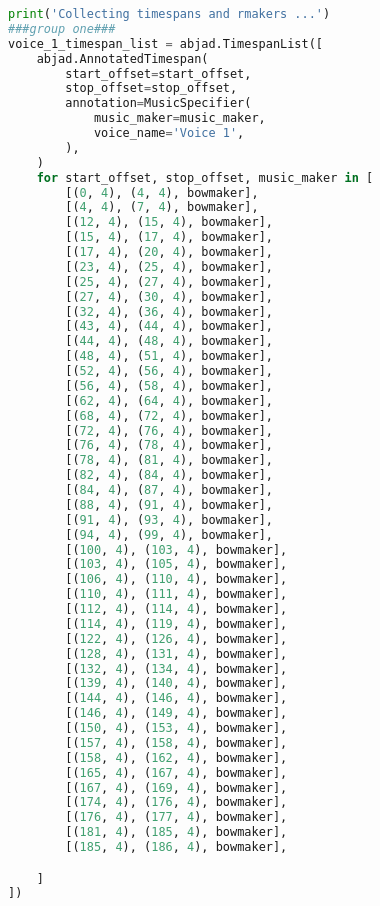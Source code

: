 \begin{lstlisting}[language=Python, caption=Cthar Segment\_I]
print('Collecting timespans and rmakers ...')
###group one###
voice_1_timespan_list = abjad.TimespanList([
    abjad.AnnotatedTimespan(
        start_offset=start_offset,
        stop_offset=stop_offset,
        annotation=MusicSpecifier(
            music_maker=music_maker,
            voice_name='Voice 1',
        ),
    )
    for start_offset, stop_offset, music_maker in [
        [(0, 4), (4, 4), bowmaker],
        [(4, 4), (7, 4), bowmaker],
        [(12, 4), (15, 4), bowmaker],
        [(15, 4), (17, 4), bowmaker],
        [(17, 4), (20, 4), bowmaker],
        [(23, 4), (25, 4), bowmaker],
        [(25, 4), (27, 4), bowmaker],
        [(27, 4), (30, 4), bowmaker],
        [(32, 4), (36, 4), bowmaker],
        [(43, 4), (44, 4), bowmaker],
        [(44, 4), (48, 4), bowmaker],
        [(48, 4), (51, 4), bowmaker],
        [(52, 4), (56, 4), bowmaker],
        [(56, 4), (58, 4), bowmaker],
        [(62, 4), (64, 4), bowmaker],
        [(68, 4), (72, 4), bowmaker],
        [(72, 4), (76, 4), bowmaker],
        [(76, 4), (78, 4), bowmaker],
        [(78, 4), (81, 4), bowmaker],
        [(82, 4), (84, 4), bowmaker],
        [(84, 4), (87, 4), bowmaker],
        [(88, 4), (91, 4), bowmaker],
        [(91, 4), (93, 4), bowmaker],
        [(94, 4), (99, 4), bowmaker],
        [(100, 4), (103, 4), bowmaker],
        [(103, 4), (105, 4), bowmaker],
        [(106, 4), (110, 4), bowmaker],
        [(110, 4), (111, 4), bowmaker],
        [(112, 4), (114, 4), bowmaker],
        [(114, 4), (119, 4), bowmaker],
        [(122, 4), (126, 4), bowmaker],
        [(128, 4), (131, 4), bowmaker],
        [(132, 4), (134, 4), bowmaker],
        [(139, 4), (140, 4), bowmaker],
        [(144, 4), (146, 4), bowmaker],
        [(146, 4), (149, 4), bowmaker],
        [(150, 4), (153, 4), bowmaker],
        [(157, 4), (158, 4), bowmaker],
        [(158, 4), (162, 4), bowmaker],
        [(165, 4), (167, 4), bowmaker],
        [(167, 4), (169, 4), bowmaker],
        [(174, 4), (176, 4), bowmaker],
        [(176, 4), (177, 4), bowmaker],
        [(181, 4), (185, 4), bowmaker],
        [(185, 4), (186, 4), bowmaker],

    ]
])


\end{lstlisting}
